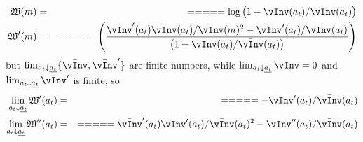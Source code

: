 \newcommand{\vPF}{\bar{\vInv}}
\newcommand{\cPF}{\bar{\cFunc}}
\newcommand{\W}{\mathfrak{W}}
\newcommand{\at}{a_{t}}
\newcommand{\atDown}{\lim_{\at \downarrow \underline{\at}}}
  \begin{equation}\begin{gathered}\begin{aligned}
    \W(m)      & = &  =  =  =  =  = \log \left(1-\vInv(\at)/\vPF(\at)\right)
\\ \W^{\prime}(m)      & = &  =  =  =  =  = \left(\frac{\vPF^{\prime}(\at)\vInv(\at)/\vPF(m)^2-\vInv^{\prime}(\at)/\vPF(\at)}{\left(1-\vInv(\at)/\vPF(\at)\right) }\right)
  \end{aligned}\end{gathered}\end{equation}
but $\atDown \{\vPF,\vPF^{\prime}\}$ are finite numbers, while $\atDown \vInv = 0$ and $\atDown \vInv^{\prime}$ is finite, so
  \begin{equation}\begin{gathered}\begin{aligned}
   \atDown \W^{\prime}(\at)      & = &  =  =  =  =  = -\vInv^{\prime}(\at)/\vPF(\at)
\\ \atDown \W^{\prime\prime}(\at)      & = &  =  =  =  =  = \vPF^{\prime}(\at)\vInv^{\prime}(\at)/\vPF(\at)^{2}-\vInv^{\prime\prime}(\at)/\vPF(\at  )
  \end{aligned}\end{gathered}\end{equation}


